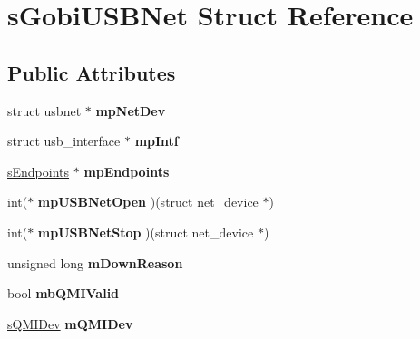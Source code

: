 \hypertarget{structsGobiUSBNet}{\section{s\-Gobi\-U\-S\-B\-Net \-Struct \-Reference}
\label{structsGobiUSBNet}
}
\subsection*{\-Public \-Attributes}
\begin{DoxyCompactItemize}
\item 
\hypertarget{structsGobiUSBNet_a3b0b3fd51786b58fb56a4356a2b927a7}{struct usbnet $\ast$ {\bfseries mp\-Net\-Dev}}\label{structsGobiUSBNet_a3b0b3fd51786b58fb56a4356a2b927a7}

\item 
\hypertarget{structsGobiUSBNet_abe2a2e73b430e6e4f8eda03b3a7c8e41}{struct usb\-\_\-interface $\ast$ {\bfseries mp\-Intf}}\label{structsGobiUSBNet_abe2a2e73b430e6e4f8eda03b3a7c8e41}

\item 
\hypertarget{structsGobiUSBNet_a7ede8803708a61dc1adc2b5e402b801a}{\hyperlink{structsEndpoints}{s\-Endpoints} $\ast$ {\bfseries mp\-Endpoints}}\label{structsGobiUSBNet_a7ede8803708a61dc1adc2b5e402b801a}

\item 
\hypertarget{structsGobiUSBNet_a207a8b1ee80e88be10c35a488921a954}{int($\ast$ {\bfseries mp\-U\-S\-B\-Net\-Open} )(struct net\-\_\-device $\ast$)}\label{structsGobiUSBNet_a207a8b1ee80e88be10c35a488921a954}

\item 
\hypertarget{structsGobiUSBNet_aad82aed616aacd8311556560c95ce1cc}{int($\ast$ {\bfseries mp\-U\-S\-B\-Net\-Stop} )(struct net\-\_\-device $\ast$)}\label{structsGobiUSBNet_aad82aed616aacd8311556560c95ce1cc}

\item 
\hypertarget{structsGobiUSBNet_a15ca5317c901febae416c4a47d19979d}{unsigned long {\bfseries m\-Down\-Reason}}\label{structsGobiUSBNet_a15ca5317c901febae416c4a47d19979d}

\item 
\hypertarget{structsGobiUSBNet_a37fab46e366dfc70ebae331d3cf230b5}{bool {\bfseries mb\-Q\-M\-I\-Valid}}\label{structsGobiUSBNet_a37fab46e366dfc70ebae331d3cf230b5}

\item 
\hypertarget{structsGobiUSBNet_adae669787a46e43db23c3ab2f0a297a8}{\hyperlink{structsQMIDev}{s\-Q\-M\-I\-Dev} {\bfseries m\-Q\-M\-I\-Dev}}\label{structsGobiUSBNet_adae669787a46e43db23c3ab2f0a297a8}


\end{DoxyCompactItemize}
